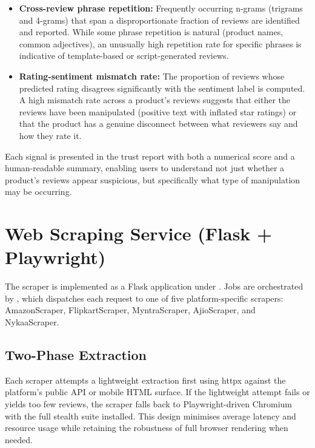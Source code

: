 \documentclass[12pt,a4paper,oneside]{report}
\renewcommand{\texttt}[1]{%
  {\ttfamily\hyphenchar\font=45\relax #1}}
\begin{document}
\begin{itemize}[leftmargin=*]
  \item \textbf{Cross-review phrase repetition:} Frequently occurring
        n-grams (trigrams and 4-grams) that span a disproportionate
        fraction of reviews are identified and reported. While some phrase
        repetition is natural (product names, common adjectives), an
        unusually high repetition rate for specific phrases is indicative
        of template-based or script-generated reviews.

  \item \textbf{Rating-sentiment mismatch rate:} The proportion of
        reviews whose predicted rating disagrees significantly with the
        sentiment label is computed. A high mismatch rate across a product's
        reviews suggests that either the reviews have been manipulated
        (positive text with inflated star ratings) or that the product
        has a genuine disconnect between what reviewers say and how they
        rate it.
\end{itemize}

Each signal is presented in the trust report with both a numerical score
and a human-readable summary, enabling users to understand not just
whether a product's reviews appear suspicious, but specifically what type
of manipulation may be occurring.

\section{Web Scraping Service (Flask + Playwright)}
The scraper is implemented as a Flask application under
. Jobs are orchestrated
by , which dispatches
each request to one of five platform-specific scrapers:
\texttt{AmazonScraper}, \texttt{FlipkartScraper}, \texttt{MyntraScraper},
\texttt{AjioScraper}, and \texttt{NykaaScraper}.

\subsection{Two-Phase Extraction}
Each scraper attempts a lightweight extraction first using \texttt{httpx}
against the platform's public API or mobile HTML surface. If the
lightweight attempt fails or yields too few reviews, the scraper falls
back to Playwright-driven Chromium with the full stealth suite
installed. This design minimises average latency and resource usage
while retaining the robustness of full browser rendering when needed.
\end{document}
